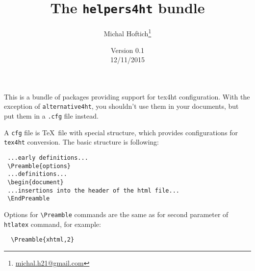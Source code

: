 \documentclass{article}
\title{The \texttt{helpers4ht} bundle}
\author{Michal Hoftich\footnote{\url{michal.h21@gmail.com}}}
\date{Version 0.1\\12/11/2015}
\begin{document}
\maketitle
\tableofcontents
This is a bundle of packages providing support for tex4ht configuration. With
the exception of \texttt{alternative4ht}, you shouldn't use them in your
documents, but put them in a \texttt{.cfg} file instead. 

A \texttt{cfg} file is \TeX\ file with special structure, which provides
configurations for  \texttt{tex4ht} conversion. The basic structure is following:

\begin{verbatim}
 ...early definitions...
 \Preamble{options}
 ...definitions...
 \begin{document}
 ...insertions into the header of the html file...
 \EndPreamble 
\end{verbatim}

Options for \verb|\Preamble| commands are the same as for second parameter of 
\texttt{htlatex} command, for example:

\begin{verbatim}
  \Preamble{xhtml,2}
\end{verbatim}





\end{document}
